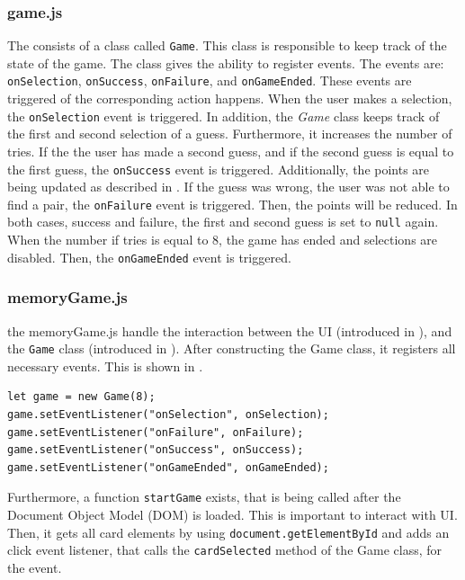 \subsubsection{game.js}\label{subsubsec:03_impl_frontend_index}
The  consists of a class called \texttt{Game}. This class is responsible to keep track of the state of the game.
The class gives the ability to register events. The events are: \texttt{onSelection}, \texttt{onSuccess}, \texttt{onFailure}, and \texttt{onGameEnded}. These events are triggered of the corresponding action happens.
When the user makes a selection, the \texttt{onSelection} event is triggered. In addition, the \textit{Game} class keeps track of the first and second selection of a guess. Furthermore, it increases the number of tries.
If the the user has made a second guess, and if the second guess is equal to the first guess, the \texttt{onSuccess} event is triggered. Additionally, the points are being updated as described in .
If the guess was wrong, the user was not able to find a pair, the \texttt{onFailure} event is triggered. Then, the points will be reduced.
In both cases, success and failure, the first and second guess is set to \texttt{null} again.
%
When the number if tries is equal to 8, the game has ended and selections are disabled. Then, the \texttt{onGameEnded} event is triggered.

\subsubsection{memoryGame.js}\label{subsubsec:03_impl_frontend_memGame}
the memoryGame.js handle the interaction between the UI (introduced in ), and the \texttt{Game} class (introduced in ).
After constructing the Game class, it registers all necessary events. This is shown in .
\begin{lstlisting}[label=lst:03_impl_frontend_memGame_events, caption=Register all events]
let game = new Game(8);
game.setEventListener("onSelection", onSelection);
game.setEventListener("onFailure", onFailure);
game.setEventListener("onSuccess", onSuccess);
game.setEventListener("onGameEnded", onGameEnded);
\end{lstlisting}


Furthermore, a function \texttt{startGame} exists, that is being called after the Document Object Model (DOM) is loaded. This is important to interact with UI. Then, it gets all card elements by using \texttt{document.getElementById} and adds an click event listener, that calls the \texttt{cardSelected} method of the Game class, for the event.

